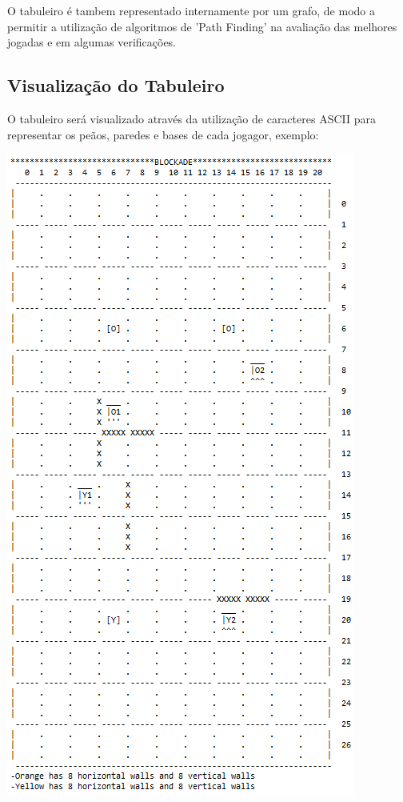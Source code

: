 \documentclass[a4paper]{article}
\begin{document}
O tabuleiro é tambem representado internamente por um grafo, de modo a permitir a utilização de algoritmos de  'Path Finding' na avaliação das melhores jogadas e em algumas verificações.

\newpage
\subsection{Visualização do Tabuleiro} 
O tabuleiro será visualizado através da utilização de caracteres ASCII para representar os peãos, paredes e bases de cada jogagor, exemplo:


\begin{center}
\includegraphics[scale = 0.7]{fig4.png}
\end{center}
\end{document}
